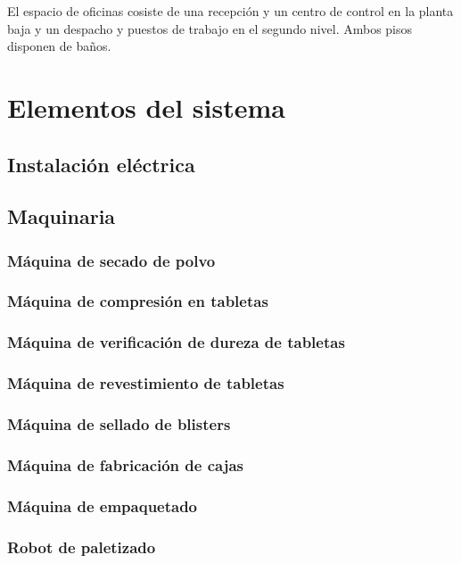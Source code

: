 El espacio de oficinas cosiste de una recepción y un centro de control en la planta baja y un despacho y puestos de trabajo en el segundo nivel. Ambos pisos disponen de baños.





\section{Elementos del sistema}

\subsection{Instalación eléctrica}
\subsection{Maquinaria}
	\subsubsection{Máquina de secado de polvo}
	\subsubsection{Máquina de compresión en tabletas}
	\subsubsection{Máquina de verificación de dureza de tabletas}
	\subsubsection{Máquina de revestimiento de tabletas}
	\subsubsection{Máquina de sellado de blisters }
	\subsubsection{Máquina de fabricación de cajas}	
	\subsubsection{Máquina de empaquetado}
	\subsubsection{Robot de paletizado}

